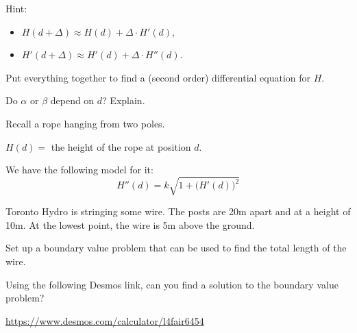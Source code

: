 \documentclass{workbook}
\begin{document}
\begin{slide}
\begin{parts}
Hint:
	\begin{itemize}
		\item $H(d+\Delta) \approx H(d) + \Delta \cdot H'(d)$,
		\item $H'(d+\Delta) \approx H'(d) + \Delta \cdot H''(d)$.
	\end{itemize}

\item Put everything together to find a (second order) differential equation for $H$.

\item Do $\alpha$ or $\beta$ depend on $d$? Explain.
	
\end{parts}
		
\end{slide}


\begin{slide}

\question

Recall a rope hanging from two poles.

\vspace{-1em}
\begin{center}
\end{center}
\vspace{-1em}
$H(d)=$ the height of the rope at position $d$.

We have the following model for it:
\[
H''(d) = k \sqrt{1+\big(H'(d)\big)^2}
\]

Toronto Hydro is stringing some wire. The posts are 20m apart and at a height of 10m. At the lowest point, the wire is 5m above the ground.

\vspace{1pt}
\begin{parts}

	\item Set up a boundary value problem that can be used to find the total length of the wire.

	\item Using the following Desmos link, can you find a solution to the boundary value problem?

		{\small \url{https://www.desmos.com/calculator/l4fair6454}}


\end{parts}
\end{slide}
\end{document}
